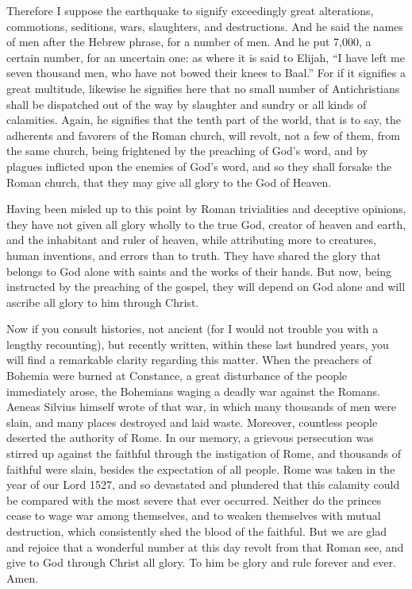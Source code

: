 Therefore I suppose the earthquake to signify exceedingly great alterations, commotions, seditions, wars, slaughters, and destructions. And he said the names of men after the Hebrew phrase, for a number of men. And he put 7,000, a certain number, for an uncertain one: as where it is said to Elijah, “I have left me seven thousand men, who have not bowed their knees to Baal.” For if it signifies a great multitude, likewise he signifies here that no small number of Antichristians shall be dispatched out of the way by slaughter and sundry or all kinds of calamities. Again, he signifies that the tenth part of the world, that is to say, the adherents and favorers of the Roman church, will revolt, not a few of them, from the same church, being frightened by the preaching of God’s word, and by plagues inflicted upon the enemies of God’s word, and so they shall forsake the Roman church, that they may give all glory to the God of Heaven.

Having been misled up to this point by Roman trivialities and deceptive opinions, they have not given all glory wholly to the true God, creator of heaven and earth, and the inhabitant and ruler of heaven, while attributing more to creatures, human inventions, and errors than to truth. They have shared the glory that belongs to God alone with saints and the works of their hands. But now, being instructed by the preaching of the gospel, they will depend on God alone and will ascribe all glory to him through Christ.

Now if you consult histories, not ancient (for I would not trouble you with a lengthy recounting), but recently written, within these last hundred years, you will find a remarkable clarity regarding this matter. When the preachers of Bohemia were burned at Constance, a great disturbance of the people immediately arose, the Bohemians waging a deadly war against the Romans. Aeneas Silvius himself wrote of that war, in which many thousands of men were slain, and many places destroyed and laid waste. Moreover, countless people deserted the authority of Rome. In our memory, a grievous persecution was stirred up against the faithful through the instigation of Rome, and thousands of faithful were slain, besides the expectation of all people. Rome was taken in the year of our Lord 1527, and so devastated and plundered that this calamity could be compared with the most severe that ever occurred. Neither do the princes cease to wage war among themselves, and to weaken themselves with mutual destruction, which consistently shed the blood of the faithful. But we are glad and rejoice that a wonderful number at this day revolt from that Roman see, and give to God through Christ all glory. To him be glory and rule forever and ever. Amen.
